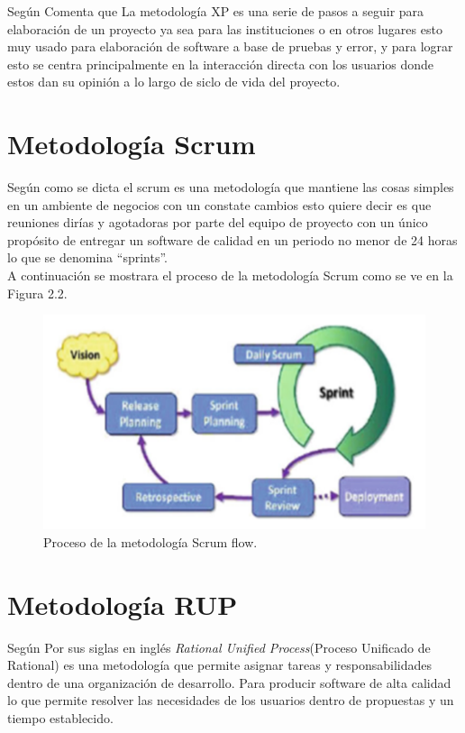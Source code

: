 \documentclass[letterpaper,oneside,openany,11pt]{book}
\begin{document}
 Según \cite {Com} Comenta que La metodología XP es una serie de pasos a seguir para elaboración de un proyecto ya sea para las instituciones o en otros lugares esto muy usado para elaboración de software a base de pruebas y error, y para lograr esto se centra principalmente en la interacción directa con los usuarios donde estos dan su opinión a lo largo de siclo de vida del proyecto.\\ 

\section{Metodología Scrum}
\noindent Según \cite{Com} como se dicta el scrum es una metodología que mantiene las cosas simples en un ambiente de negocios con un constate cambios esto quiere decir es que reuniones dirías y agotadoras por parte del equipo de proyecto con un único propósito de entregar un software de calidad en un periodo no menor de 24 horas lo que se denomina “sprints”. \\

A continuación se mostrara el proceso de la metodología Scrum como se ve en la Figura 2.2.\\

\begin{figure}[H]
	\centering
	\includegraphics[width=1.0\textwidth]{./Imagenes/2}
	\caption{Proceso de la metodología Scrum ﬂow.}
\end{figure}

\section{Metodología RUP}
\noindent Según \cite{Chacon} Por sus siglas en inglés \textit{Rational Unified Process}(Proceso Unificado de Rational) es una metodología que permite asignar tareas y responsabilidades dentro de una organización de desarrollo. Para producir software de alta calidad lo que permite resolver las necesidades de los usuarios dentro de propuestas y un tiempo establecido. \\
\end{document}
